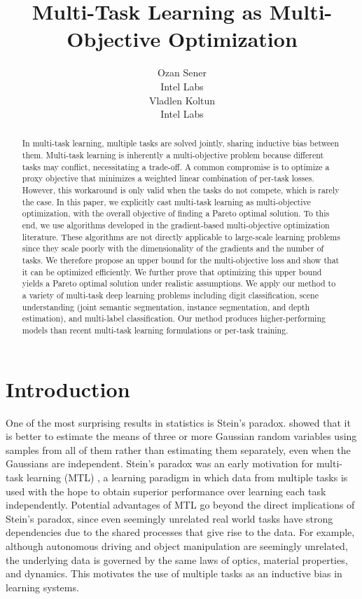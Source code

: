 \documentclass{article}
\title{Multi-Task Learning as Multi-Objective Optimization}
\author{
  Ozan Sener\\
  Intel Labs\\
\And
  Vladlen Koltun\\
  Intel Labs\\
}
\begin{document}
\maketitle

\begin{abstract}
In multi-task learning, multiple tasks are solved jointly, sharing inductive bias between them. Multi-task learning is inherently a multi-objective problem because different tasks may conflict, necessitating a trade-off. A common compromise is to optimize a proxy objective that minimizes a weighted linear combination of per-task losses. However, this workaround is only valid when the tasks do not compete, which is rarely the case. In this paper, we explicitly cast multi-task learning as multi-objective optimization, with the overall objective of finding a Pareto optimal solution. To this end, we use algorithms developed in the gradient-based multi-objective optimization literature. These algorithms are not directly applicable to large-scale learning problems since they scale poorly with the dimensionality of the gradients and the number of tasks. We therefore propose an upper bound for the multi-objective loss and show that it can be optimized efficiently. We further prove that optimizing this upper bound yields a Pareto optimal solution under realistic assumptions. We apply our method to a variety of multi-task deep learning problems including digit classification, scene understanding (joint semantic segmentation, instance segmentation, and depth estimation), and multi-label classification. Our method produces higher-performing models than recent multi-task learning formulations or per-task training.
\end{abstract}


\section{Introduction}
\label{sec:introduction}
One of the most surprising results in statistics is Stein's paradox. \citet{Stein1956} showed that it is better
to estimate the means of three or more Gaussian random variables using samples from all of them rather than estimating them separately, even when the Gaussians are independent. Stein's paradox was an early motivation for multi-task learning (MTL) \citep{Caruana1997}, a learning paradigm in which data from multiple tasks is used with the hope to obtain superior performance over learning each task independently. Potential advantages of MTL go beyond the direct implications of Stein's paradox, since even seemingly unrelated real world tasks have strong dependencies due to the shared processes that give rise to the data. For example, although autonomous driving and object manipulation are seemingly unrelated, the underlying data is governed by the same laws of optics, material properties, and dynamics. This motivates the use of multiple tasks as an inductive bias in learning systems.
\end{document}
